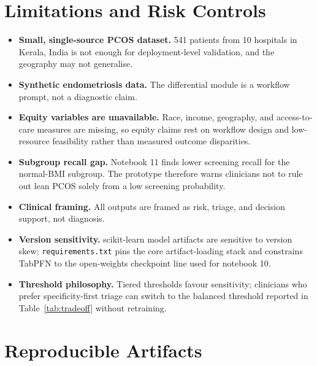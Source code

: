 \documentclass[11pt]{article}
\newcommand{\code}[1]{\texttt{\small #1}}
\begin{document}
\section{Limitations and Risk Controls}

\begin{itemize}
  \item \textbf{Small, single-source PCOS dataset.} 541 patients from 10 hospitals in Kerala, India is not enough for deployment-level validation, and the geography may not generalise.
  \item \textbf{Synthetic endometriosis data.} The differential module is a workflow prompt, not a diagnostic claim.
  \item \textbf{Equity variables are unavailable.} Race, income, geography, and access-to-care measures are missing, so equity claims rest on workflow design and low-resource feasibility rather than measured outcome disparities.
  \item \textbf{Subgroup recall gap.} Notebook 11 finds lower screening recall for the normal-BMI subgroup. The prototype therefore warns clinicians not to rule out lean PCOS solely from a low screening probability.
  \item \textbf{Clinical framing.} All outputs are framed as risk, triage, and decision support, not diagnosis.
  \item \textbf{Version sensitivity.} scikit-learn model artifacts are sensitive to version skew; \code{requirements.txt} pins the core artifact-loading stack and constrains TabPFN to the open-weights checkpoint line used for notebook 10.
  \item \textbf{Threshold philosophy.} Tiered thresholds favour sensitivity; clinicians who prefer specificity-first triage can switch to the balanced threshold reported in Table~\ref{tab:tradeoff} without retraining.
\end{itemize}

\section{Reproducible Artifacts}
\end{document}
